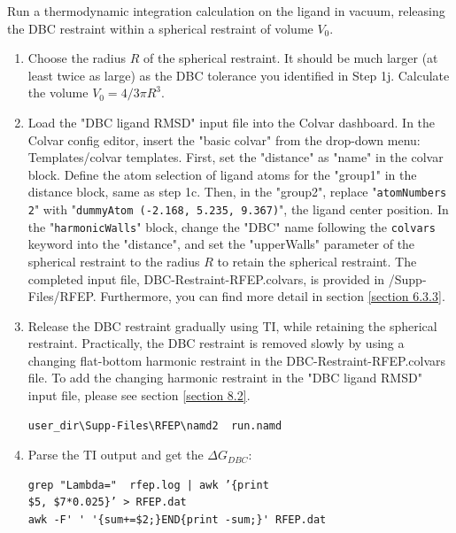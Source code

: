 \documentclass[9pt,tutorial]{livecoms}
\begin{document}
\begin{enumerate}[left=0pt .. \parindent]
Run a thermodynamic integration calculation on the ligand in vacuum, releasing the DBC restraint within a spherical restraint of volume $V_0$. 
\begin{enumerate}
\item Choose the radius $R$ of the spherical restraint. It should be much larger (at least twice as large) as the DBC tolerance you identified in Step 1j. Calculate the volume $V_0 = 4/3\pi R^3$.
\item Load the "DBC ligand RMSD" input file into the Colvar dashboard. In the Colvar config editor, insert the "basic colvar" from the drop-down menu: Templates/colvar templates. First, set the "distance" as "name" in the colvar block. Define the atom selection of ligand atoms for the "group1" in the distance block, same as step 1c. Then, in the "group2", replace "\texttt{atomNumbers 2}" with "\texttt{dummyAtom (-2.168, 5.235, 9.367)}", the ligand center position. In the "\texttt{harmonicWalls}" block, change the "DBC" name following the \texttt{colvars} keyword into the "distance", and set the "upperWalls" parameter of the spherical restraint to the radius $R$ to retain the spherical restraint. The completed input file, DBC-Restraint-RFEP.colvars, is provided in /Supp-Files/RFEP. Furthermore, you can find more detail in section \ref{section 6.3.3}.
\item Release the DBC restraint gradually using TI, while retaining the spherical restraint. Practically, the DBC restraint is removed slowly by using a changing flat-bottom harmonic restraint in the DBC-Restraint-RFEP.colvars file. To add the changing harmonic restraint in the "DBC ligand RMSD" input file, please see section \ref{section 8.2}.
\begin{verbatim}
user_dir\Supp-Files\RFEP\namd2  run.namd 
\end{verbatim}
\item Parse the TI output and get the $\Delta G_{DBC}$:
\begin{verbatim}
grep "Lambda="  rfep.log | awk ’{print 
$5, $7*0.025}’ > RFEP.dat
awk -F' ' '{sum+=$2;}END{print -sum;}' RFEP.dat
\end{verbatim}


\end{enumerate}
\end{enumerate}
\end{document}
